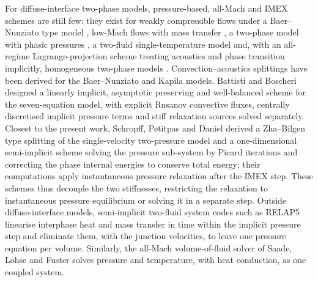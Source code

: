 For diffuse-interface two-phase models, pressure-based, all-Mach and IMEX schemes are still few: they exist for weakly
compressible flows under a Baer--Nunziato type model \cite{ReAbgrall2022}, low-Mach flows with mass transfer
\cite{Demou2022}, a two-phase model with phasic pressures \cite{MalusaAlaia2024}, a two-fluid single-temperature model
\cite{Lukacova2024} and, with an all-regime Lagrange-projection scheme treating acoustics and phase transition
implicitly, homogeneous two-phase models \cite{ChalonsGirardinKokh2017}. Con\-vec\-tion--acous\-tics splittings have been
derived for the Baer--Nunziato \cite{TokarevaToro2017} and Kapila \cite{tenEikelder2017} models. Battisti and Boscheri
\cite{BattistiBoscheri2025} designed a linearly implicit, asymptotic preserving and well-balanced scheme for the
seven-equation model, with explicit Rusanov convective fluxes, centrally discretised implicit pressure terms and stiff
relaxation sources solved separately. Closest to the present work, Schropff, Petitpas and Daniel \cite{Schropff2026}
derived a Zha--Bilgen type splitting of the single-velocity two-pressure model and a one-dimensional semi-implicit
scheme solving the pressure sub-system by Picard iterations and correcting the phase internal energies to conserve total
energy; their computations apply instantaneous pressure relaxation after the IMEX step. These schemes thus decouple the
two stiffnesses, restricting the relaxation to instantaneous pressure equilibrium or solving it in a separate step.
Outside diffuse-interface models, semi-implicit two-fluid system codes such as RELAP5 \cite{RELAP5} linearise interphase
heat and mass transfer in time within the implicit pressure step and eliminate them, with the junction velocities, to
leave one pressure equation per volume. Similarly, the all-Mach volume-of-fluid solver of Saade, Lohse and Fuster
\cite{Saade2023} solves pressure and temperature, with heat conduction, as one coupled system.

